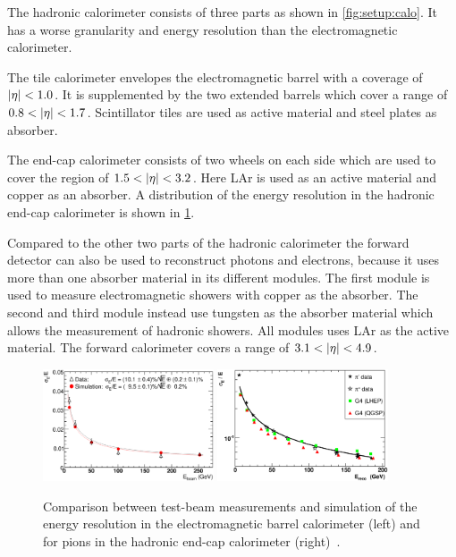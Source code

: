 The hadronic calorimeter consists of three parts as shown in \cref{fig:setup:calo}.
It has a worse granularity and energy resolution than the electromagnetic calorimeter.

The tile calorimeter envelopes the electromagnetic barrel with a coverage of $\left|\eta\right| < 1.0$.
It is supplemented by the two extended barrels which cover a range of $0.8 < \left|\eta\right| < 1.7$.
Scintillator tiles are used as active material and steel plates as absorber.

The end-cap calorimeter consists of two wheels on each side which are used to cover the region of $1.5 < \left|\eta\right| < 3.2$.
Here LAr is used as an active material and copper as an absorber.
A distribution of the energy resolution in the hadronic end-cap calorimeter is shown in \cref{fig:setup:calo:eres}.

Compared to the other two parts of the hadronic calorimeter the forward detector can also be used to reconstruct photons
and electrons, because it uses more than one absorber material in its different modules.
The first module is used to measure electromagnetic showers with copper as the absorber.
The second and third module instead use tungsten as the absorber material which allows the measurement of hadronic showers.
All modules uses LAr as the active material.
The forward calorimeter covers a range of $3.1 < \left|\eta\right| < 4.9$.

\begin{figure}[htb]
    \centering
    \includegraphics[width=0.45\textwidth]{./figures/setup/eres_ecal_barrel.eps}
    \includegraphics[width=0.45\textwidth]{./figures/setup/eres_hcal.eps}
    \caption{Comparison between test-beam measurements and simulation of the energy resolution
            in the electromagnetic barrel calorimeter (left) and for pions in the
            hadronic end-cap calorimeter (right)~\cite{ATLAS}.}\label{fig:setup:calo:eres}
\end{figure}


